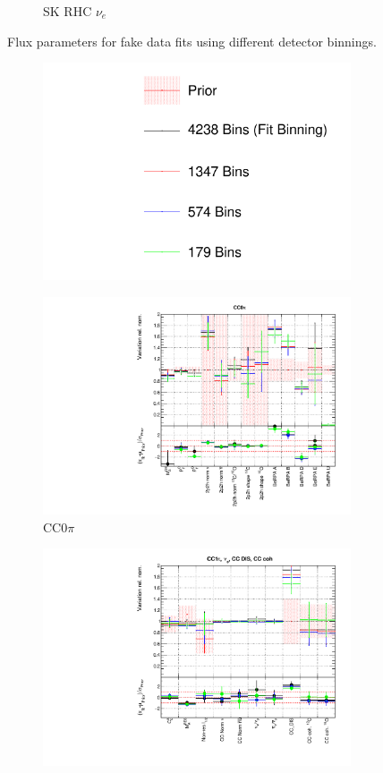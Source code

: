 \begin{figure}[t]
\begin{subfigure}{0.24\textwidth}
  \caption{SK RHC $\nu_e$}
  \label{fig:}
\end{subfigure}
\caption{Flux parameters for fake data fits using different detector binnings.}
\label{fig:detcovbinfluxSK}
\end{figure}

\begin{figure}
\centering
\begin{subfigure}{0.95\textwidth}
  \centering
  \includegraphics[width=0.25\linewidth]{figs/detcovbin_leg}
  \caption{}
  \label{fig:}
\end{subfigure}
\begin{subfigure}{0.49\textwidth}
  \centering
  \includegraphics[width=0.95\linewidth]{figs/detcovbinxsec_1}
  \caption{CC0$\pi$}
  \label{fig:}
\end{subfigure}
\begin{subfigure}{0.49\textwidth}
  \centering
  \includegraphics[width=0.95\linewidth]{figs/detcovbinxsec_2}

\end{subfigure}
\end{figure}
